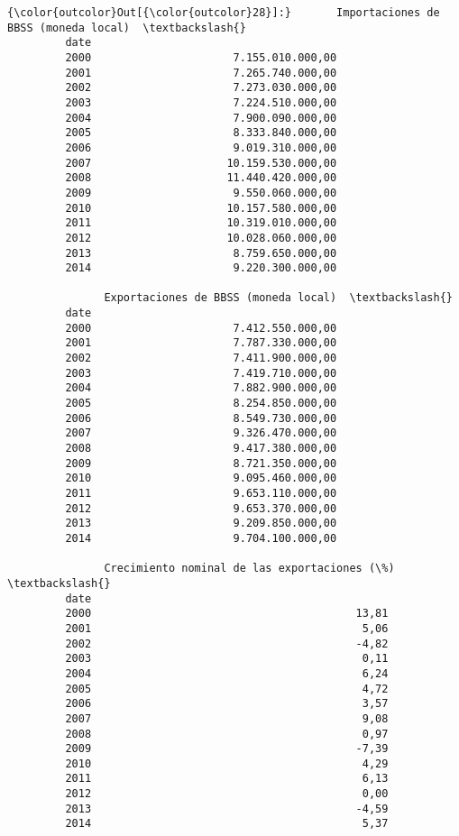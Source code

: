 \documentclass[11pt]{article}
\begin{document}
            \begin{Verbatim}[commandchars=\\\{\}]
{\color{outcolor}Out[{\color{outcolor}28}]:}       Importaciones de BBSS (moneda local)  \textbackslash{}
         date                                         
         2000                      7.155.010.000,00   
         2001                      7.265.740.000,00   
         2002                      7.273.030.000,00   
         2003                      7.224.510.000,00   
         2004                      7.900.090.000,00   
         2005                      8.333.840.000,00   
         2006                      9.019.310.000,00   
         2007                     10.159.530.000,00   
         2008                     11.440.420.000,00   
         2009                      9.550.060.000,00   
         2010                     10.157.580.000,00   
         2011                     10.319.010.000,00   
         2012                     10.028.060.000,00   
         2013                      8.759.650.000,00   
         2014                      9.220.300.000,00   
         
               Exportaciones de BBSS (moneda local)  \textbackslash{}
         date                                         
         2000                      7.412.550.000,00   
         2001                      7.787.330.000,00   
         2002                      7.411.900.000,00   
         2003                      7.419.710.000,00   
         2004                      7.882.900.000,00   
         2005                      8.254.850.000,00   
         2006                      8.549.730.000,00   
         2007                      9.326.470.000,00   
         2008                      9.417.380.000,00   
         2009                      8.721.350.000,00   
         2010                      9.095.460.000,00   
         2011                      9.653.110.000,00   
         2012                      9.653.370.000,00   
         2013                      9.209.850.000,00   
         2014                      9.704.100.000,00   
         
               Crecimiento nominal de las exportaciones (\%)  \textbackslash{}
         date                                                 
         2000                                         13,81   
         2001                                          5,06   
         2002                                         -4,82   
         2003                                          0,11   
         2004                                          6,24   
         2005                                          4,72   
         2006                                          3,57   
         2007                                          9,08   
         2008                                          0,97   
         2009                                         -7,39   
         2010                                          4,29   
         2011                                          6,13   
         2012                                          0,00   
         2013                                         -4,59   
         2014                                          5,37   
         

\end{Verbatim}
\end{document}
